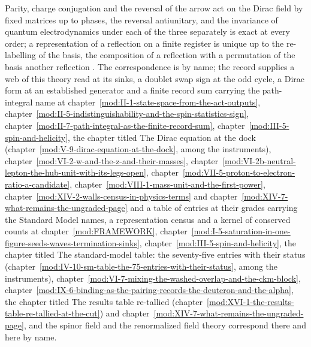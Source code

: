 \begin{chbridge}
Parity, charge conjugation and the reversal of the arrow act on the Dirac field by fixed matrices up to phases, the reversal antiunitary, and the invariance of quantum electrodynamics under each of the three separately is exact at every order; a representation of a reflection on a finite register is unique up to the re-labelling of the basis, the composition of a reflection with a permutation of the basis another reflection \cite{Luders1954,Wigner1932}. The correspondence is by name; the record supplies a web of this theory read at its sinks, a doublet swap sign at the odd cycle, a Dirac form at an established generator and a finite record sum carrying the path-integral name at chapter~\ref{mod:II-1-state-space-from-the-act-outputs}, chapter~\ref{mod:II-5-indistinguishability-and-the-spin-statistics-sign}, chapter~\ref{mod:II-7-path-integral-as-the-finite-record-sum}, chapter~\ref{mod:III-5-spin-and-helicity}, the chapter titled The Dirac equation at the dock (chapter~\ref{mod:V-9-dirac-equation-at-the-dock}, among the instruments), chapter~\ref{mod:VI-2-w-and-the-z-and-their-masses}, chapter~\ref{mod:VI-2b-neutral-lepton-the-hub-unit-with-its-legs-open}, chapter~\ref{mod:VII-5-proton-to-electron-ratio-a-candidate}, chapter~\ref{mod:VIII-1-mass-unit-and-the-first-power}, chapter~\ref{mod:XIV-2-walls-census-in-physics-terms} and chapter~\ref{mod:XIV-7-what-remains-the-ungraded-page} and a table of entries at their grades carrying the Standard Model names, a representation census and a kernel of conserved counts at chapter~\ref{mod:FRAMEWORK}, chapter~\ref{mod:I-5-saturation-in-one-figure-seeds-waves-termination-sinks}, chapter~\ref{mod:III-5-spin-and-helicity}, the chapter titled The standard-model table: the seventy-five entries with their status (chapter~\ref{mod:IV-10-sm-table-the-75-entries-with-their-status}, among the instruments), chapter~\ref{mod:VI-7-mixing-the-washed-overlap-and-the-ckm-block}, chapter~\ref{mod:IX-6-binding-as-the-pairing-records-the-deuteron-and-the-alpha}, the chapter titled The results table re-tallied (chapter~\ref{mod:XVI-1-the-results-table-re-tallied-at-the-cut}) and chapter~\ref{mod:XIV-7-what-remains-the-ungraded-page}, and the spinor field and the renormalized field theory correspond there and here by name.
\end{chbridge}

